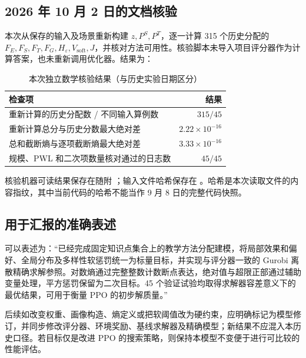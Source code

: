 \documentclass[UTF8,11pt,a4paper,fontset=fandol]{ctexart}
\begin{document}
\subsection{2026 年 10 月 2 日的文档核验}
本次从保存的输入及场景重新构建 $z,P^S,P^T$，逐一计算 315 个历史分配的 $F_E,F_S,F_T,F_G,H_\varepsilon,V_{\mathrm{soft}},J$，并核对方法可用性。核验脚本未导入项目评分器作为计算答案，也未重新调用优化器。结果为：
\begin{table}[htbp]
\centering\small
\caption{本次独立数学核验结果（与历史实验日期区分）}
\begin{tabularx}{\textwidth}{Xr}
\toprule 检查项 & 结果 \\ \midrule
重新计算的历史分配数 / 不同输入算例数 & $315/45$ \\
重新计算总分与历史分数最大绝对差 & $2.22\times10^{-16}$ \\
总和截断熵与逐项截断熵最大绝对差 & $3.33\times10^{-16}$ \\
规模、PWL 和二次项数量核对通过的日志数 & $45/45$ \\
\bottomrule
\end{tabularx}
\end{table}
核验机器可读结果保存在随附 ；输入文件哈希保存在 。哈希是本次读取文件的内容指纹，其中当前代码的哈希不能当作 9 月 8 日的完整代码快照。

\subsection{用于汇报的准确表述}
可以表述为：“已经完成固定知识点集合上的教学方法分配建模，将局部效果和偏好、全局分布及多样性软惩罚统一为标量目标，并实现与评分器一致的 Gurobi 离散精确求解参照。对数熵通过完整整数计数断点表达，绝对值与超限正部通过辅助变量处理，平方惩罚保留为二次目标。45 个验证试验均取得求解器容差意义下的最优结果，可用于衡量 PPO 的初步解质量。”

后续如改变权重、画像构造、熵定义或把软阈值改为硬约束，应明确标记为模型修订，并同步修改评分器、环境奖励、基线求解器及精确模型；新结果不应混入本历史口径。若目标仅是改进 PPO 的搜索策略，则保持本模型不变便于进行可比较的性能评估。

\appendix
\end{document}
